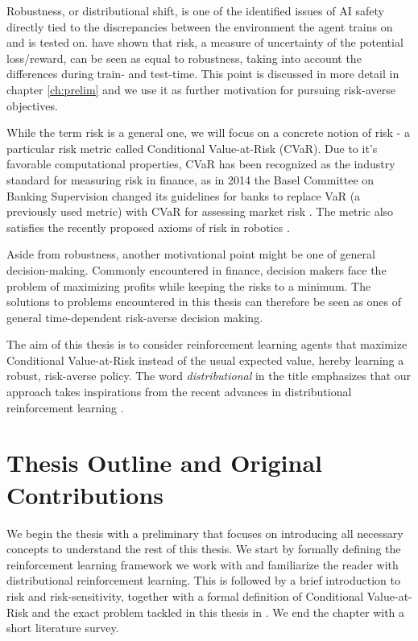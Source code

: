 Robustness, or distributional shift, is one of the identified issues of AI safety \citep{leike2017ai, amodei2016concrete} directly tied to the discrepancies between the environment the agent trains on and is tested on. \citet{chow2015risk} have shown that risk, a measure of uncertainty of the potential loss/reward, can be seen as equal to robustness, taking into account the differences during train- and test-time. This point is discussed in more detail in chapter \ref{ch:prelim} and we use it as further motivation for pursuing risk-averse objectives.

While the term risk is a general one, we will focus on a concrete notion of risk - a particular risk metric called Conditional Value-at-Risk (CVaR). 
Due to it's favorable computational properties, CVaR has been recognized as the industry standard for measuring risk in finance, as in 2014 the Basel Committee on Banking Supervision changed its guidelines for banks to replace VaR (a previously used metric) with CVaR for assessing market risk \citep{basel2013fundamental}. The metric also satisfies the recently proposed axioms of risk in robotics \citep{majumdar2017should}.

Aside from robustness, another motivational point might be one of general decision-making. Commonly encountered in finance, decision makers face the problem of maximizing profits while keeping the risks to a minimum. The solutions to problems encountered in this thesis can therefore be seen as ones of general time-dependent risk-averse decision making.

The aim of this thesis is to consider reinforcement learning agents that maximize Conditional Value-at-Risk instead of the usual expected value, hereby learning a robust, risk-averse policy. The word \textit{distributional} in the title emphasizes that our approach takes inspirations from the recent advances in distributional reinforcement learning \citep{bellemare2017distributional, dabney2017distributional}.



\section{Thesis Outline and Original Contributions}

We begin the thesis with a preliminary  that focuses on introducing all necessary concepts to understand the rest of this thesis. We start by formally defining the reinforcement learning framework we work with and familiarize the reader with distributional reinforcement learning. This is followed by a brief introduction to risk and risk-sensitivity, together with a formal definition of Conditional Value-at-Risk and the exact problem tackled in this thesis in . We end the chapter with a short literature survey.

